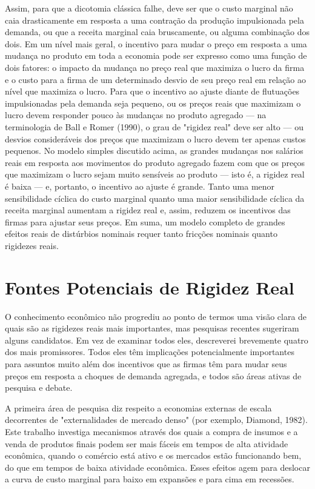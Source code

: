 \documentclass[12pt]{article}
\begin{document}
Assim, para que a dicotomia clássica falhe, deve ser que o custo marginal não caia drasticamente em resposta a uma contração da produção impulsionada pela demanda, ou que a receita marginal caia bruscamente, ou alguma combinação dos dois. Em um nível mais geral, o incentivo para mudar o preço em resposta a uma mudança no produto em toda a economia pode ser expresso como uma função de dois fatores: o impacto da mudança no preço real que maximiza o lucro da firma e o custo para a firma de um determinado desvio de seu preço real em relação ao nível que maximiza o lucro. Para que o incentivo ao ajuste diante de flutuações impulsionadas pela demanda seja pequeno, ou os preços reais que maximizam o lucro devem responder pouco às mudanças no produto agregado — na terminologia de Ball e Romer (1990), o grau de "rigidez real" deve ser alto — ou desvios consideráveis dos preços que maximizam o lucro devem ter apenas custos pequenos. No modelo simples discutido acima, as grandes mudanças nos salários reais em resposta aos movimentos do produto agregado fazem com que os preços que maximizam o lucro sejam muito sensíveis ao produto — isto é, a rigidez real é baixa — e, portanto, o incentivo ao ajuste é grande. Tanto uma menor sensibilidade cíclica do custo marginal quanto uma maior sensibilidade cíclica da receita marginal aumentam a rigidez real e, assim, reduzem os incentivos das firmas para ajustar seus preços. Em suma, um modelo completo de grandes efeitos reais de distúrbios nominais requer tanto fricções nominais quanto rigidezes reais.

\section*{Fontes Potenciais de Rigidez Real}

O conhecimento econômico não progrediu ao ponto de termos uma visão clara de quais são as rigidezes reais mais importantes, mas pesquisas recentes sugeriram alguns candidatos. Em vez de examinar todos eles, descreverei brevemente quatro dos mais promissores. Todos eles têm implicações potencialmente importantes para assuntos muito além dos incentivos que as firmas têm para mudar seus preços em resposta a choques de demanda agregada, e todos são áreas ativas de pesquisa e debate.

A primeira área de pesquisa diz respeito a economias externas de escala decorrentes de "externalidades de mercado denso" (por exemplo, Diamond, 1982). Este trabalho investiga mecanismos através dos quais a compra de insumos e a venda de produtos finais podem ser mais fáceis em tempos de alta atividade econômica, quando o comércio está ativo e os mercados estão funcionando bem, do que em tempos de baixa atividade econômica. Esses efeitos agem para deslocar a curva de custo marginal para baixo em expansões e para cima em recessões.
\end{document}
